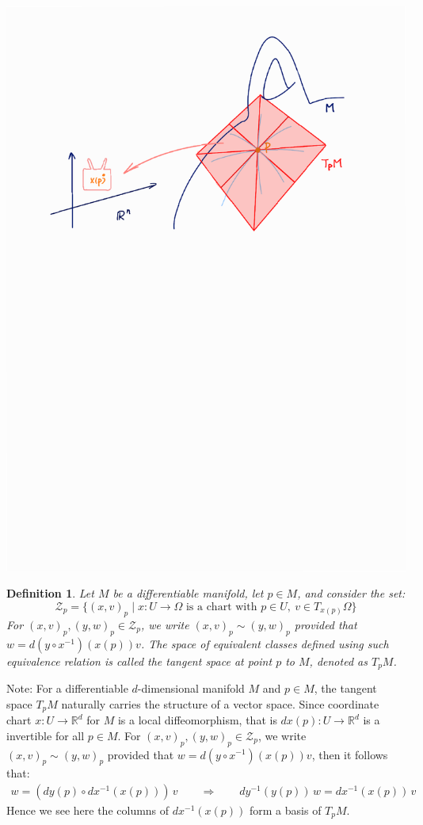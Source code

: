 \documentclass[11pt]{book}
\theoremstyle{break}
\theoremstyle{break}
\newtheorem{defn}{Definition}[corL]
\newcommand{\R}{\mathbb{R}}
\newcommand{\note}{\color{red}Note: \color{black}}
\begin{document}
\begin{center}
\includegraphics[scale=0.69]{tangentPlane}
\end{center}


\begin{defn}
Let $M$ be a differentiable manifold, let $p\in M$, and consider the set: 
$$\mathcal{Z}_p = \{(x,v)_p\mid x : U \to \Omega \text{ is a chart with }p \in U,\ v\in T_{x(p)}\Omega\}$$
For $(x,v)_p,(y,w)_p \in \mathcal{Z}_p$, we write $(x,v)_p \sim(y,w)_p$ provided that $w = d(y\circ x^{-1})(x(p))v$. The space of equivalent classes defined using such equivalence relation is called the tangent space at point $p$ to $M$, denoted as $T_p M$.  
\end{defn}

\note For a differentiable $d$-dimensional manifold $M$ and $p \in M$, the tangent space $T_pM$ naturally carries the structure of a vector space. Since coordinate chart $x:U \to \R^d$ for $M$ is a local diffeomorphism, that is $dx(p):U \to \R^d$ is a invertible for all $p \in M$. For $(x,v)_p,(y,w)_p \in \mathcal{Z}_p$, we write $(x,v)_p \sim(y,w)_p$ provided that $w = d(y\circ x^{-1})(x(p))v$, then it follows that:
\begin{align*}
w =\left( dy(p) \circ dx^{-1}(x(p)) \right)\, v\qquad \Rightarrow \qquad dy^{-1}(y(p)) \, w = dx^{-1}(x(p)) \, v
\end{align*}
Hence we see here the columns of $d x^{-1}(x(p))$ form a basis of $T_pM$.  
\end{document}
